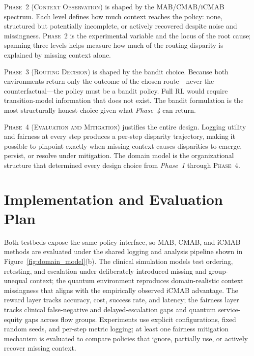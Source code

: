 \documentclass{IEEEtran}
\begin{document}
\textsc{Phase~2 (Context Observation)} is shaped by the MAB/CMAB/iCMAB
spectrum. Each level defines how much context reaches the policy: none,
structured but potentially incomplete, or actively recovered despite noise
and missingness. \textsc{Phase~2} is the experimental variable and the locus of the
root cause; spanning three levels helps measure how much of the routing disparity is
explained by missing context alone.

\textsc{Phase~3 (Routing Decision)} is shaped by the bandit choice. Because
both environments return only the outcome of the chosen route---never the
counterfactual---the policy must be a bandit policy. Full RL would require
transition-model information that does not exist. The bandit formulation is
the most structurally honest choice given what \textit{Phase~4} can return.

\textsc{Phase~4 (Evaluation and Mitigation)} justifies the entire design.
Logging utility and fairness at every step produces a per-step disparity
trajectory, making it possible to pinpoint exactly when missing context
causes disparities to emerge, persist, or resolve under mitigation. The
domain model is the organizational structure that determined every design
choice from \textit{Phase~1} through \textsc{Phase~4}.

\section{Implementation and Evaluation Plan}

Both testbeds expose the same policy interface, so MAB, CMAB, and iCMAB
methods are evaluated under the shared logging and analysis pipeline shown in
Figure~\ref{fig:domain_model}(b). The
clinical simulation models test ordering, retesting, and escalation under
deliberately introduced missing and group-unequal context; the quantum
environment reproduces domain-realistic context missingness that aligns with
the empirically observed iCMAB advantage. The reward layer tracks accuracy,
cost, success rate, and latency; the fairness layer tracks clinical
false-negative and delayed-escalation gaps and quantum service-equity gaps
across flow groups. Experiments use explicit configurations, fixed
random seeds, and per-step metric logging; at least one fairness
mitigation mechanism is evaluated to compare policies that
ignore, partially use, or actively recover missing context.
\end{document}
